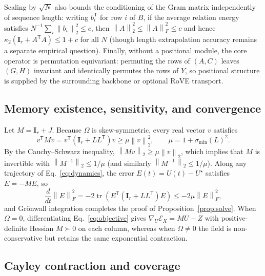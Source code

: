 \documentclass[10pt,twocolumn]{article}
\newcommand{\I}{\mathbf{I}}
\newcommand{\T}{\mathsf{T}}
\newcommand{\norm}[1]{\left\lVert #1 \right\rVert}
\newcommand{\tr}{\operatorname{tr}}
\begin{document}
Scaling by $\sqrt N$ also bounds the conditioning of the Gram matrix
independently of sequence length: writing $b_i^\T$ for row $i$ of $B$, if the
average relation energy satisfies $N^{-1}\sum_i\norm{b_i}_2^2\le c$, then
$\norm{A}_2^2\le\norm{A}_F^2\le c$ and hence $\kappa_2(\I_r+A^\T A)\le1+c$ for
all $N$ (though length extrapolation accuracy remains a separate empirical
question).
Finally, without a positional module, the core operator is permutation
equivariant: permuting the rows of $(A,C)$ leaves $(G,H)$ invariant and
identically permutes the rows of $Y$, so positional structure is supplied by
the surrounding backbone or optional RoVE transport.

\subsection{Memory existence, sensitivity, and convergence}

Let $M=\I_r+J$. Because $\Omega$ is skew-symmetric, every real vector $v$
satisfies
\begin{equation}
 v^\T Mv=v^\T(\I_r+LL^\T)v\ge\mu\norm{v}_2^2,
 \qquad \mu=1+\sigma_{\min}(L)^2.
\end{equation}
By the Cauchy--Schwarz inequality, $\norm{Mv}_2\ge\mu\norm{v}_2$, which
implies that $M$ is invertible with $\norm{M^{-1}}_2\le1/\mu$ (and similarly
$\norm{M^{-\T}}_2\le1/\mu$).
Along any trajectory of Eq.~\eqref{eq:dynamics}, the error $E(t)=U(t)-U^\star$
satisfies $\dot E=-ME$, so
\begin{equation}
 \frac{d}{dt}\norm{E}_F^2
 =-2\tr(E^\T(\I_r+LL^\T)E)\le-2\mu\norm{E}_F^2,
\end{equation}
and Gr\"onwall integration completes the proof of Proposition~\ref{prop:solve}.
When $\Omega=0$, differentiating Eq.~\eqref{eq:objective} gives
$\nabla_U\mathcal E_X=MU-Z$ with positive-definite Hessian $M\succ0$ on each
column, whereas when $\Omega\ne0$ the field is non-conservative but retains
the same exponential contraction.

\subsection{Cayley contraction and coverage}
\label{app:coverage}
\end{document}
